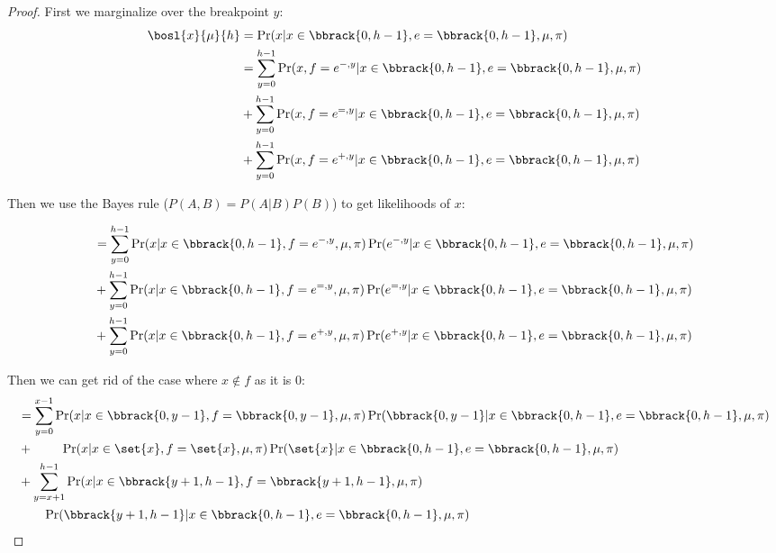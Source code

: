 \begin{proof}

First we marginalize over the breakpoint $y$:
\begin{align}
    \bosl{x}{\mu}{h}
    &= \Pr(x | x \in \bbrack{0, h - 1}, e = \bbrack{0, h - 1}, \mu, \pi) \\
    &
    \begin{aligned}
        &= \sum_{y = 0}^{h - 1} \Pr(x, f=e^{-, y} | x \in \bbrack{0, h - 1}, e = \bbrack{0, h - 1}, \mu, \pi)\\
        &+ \sum_{y = 0}^{h - 1} \Pr(x, f=e^{=, y} | x \in \bbrack{0, h - 1}, e = \bbrack{0, h - 1}, \mu, \pi)\\
        &+ \sum_{y = 0}^{h - 1} \Pr(x, f=e^{+, y} | x \in \bbrack{0, h - 1}, e = \bbrack{0, h - 1}, \mu, \pi)
    \end{aligned} \\
\end{align}

Then we use the Bayes rule ($P(A, B) = P(A | B) P(B)$) to get likelihoods of $x$:

\begin{align}
    &
    \begin{aligned}
        &=\sum_{y = 0}^{h - 1} \Pr(x | x \in \bbrack{0, h - 1}, f = e^{-, y}, \mu, \pi) \Pr(e^{-, y} | x \in \bbrack{0, h - 1}, e = \bbrack{0, h - 1}, \mu, \pi)\\
        &+ \sum_{y = 0}^{h - 1} \Pr(x | x \in \bbrack{0, h - 1}, f = e^{=, y}, \mu, \pi) \Pr(e^{=, y} | x \in \bbrack{0, h - 1}, e = \bbrack{0, h - 1}, \mu, \pi)\\
        &+ \sum_{y = 0}^{h - 1} \Pr(x | x \in \bbrack{0, h - 1}, f = e^{+, y}, \mu, \pi) \Pr(e^{+, y} | x \in \bbrack{0, h - 1}, e = \bbrack{0, h - 1}, \mu, \pi)
    \end{aligned} \\
\end{align}

Then we can get rid of the case where $x \notin f$ as it is $0$: 
\begin{align}
    &
    \begin{aligned}
        &=\sum_{y = 0}^{x - 1} \Pr(x | x \in \bbrack{0, y - 1}, f = \bbrack{0, y - 1} , \mu, \pi) \Pr(\bbrack{0, y - 1} | x \in \bbrack{0, h - 1}, e = \bbrack{0, h - 1}, \mu, \pi)\\
        &+\ \qquad \Pr(x | x \in \set{x}, f = \set{x}, \mu, \pi) \Pr(\set{x} | x \in \bbrack{0, h - 1}, e = \bbrack{0, h - 1}, \mu, \pi)\\
        &+ \sum_{y = x + 1}^{h - 1} \Pr(x | x \in \bbrack{y + 1, h - 1}, f = \bbrack{y + 1, h - 1}, \mu, \pi) \\
        &\qquad \Pr(\bbrack{y + 1, h - 1} | x \in \bbrack{0, h - 1}, e = \bbrack{0, h - 1}, \mu, \pi)
    \end{aligned} \\
\end{align}


\end{proof}
